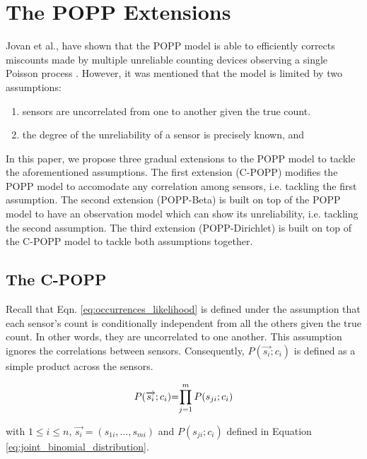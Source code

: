 \section{The POPP Extensions}
\label{sec:popp_extensions}

Jovan et al., have shown that the POPP model is able to efficiently corrects miscounts made by multiple unreliable counting devices observing a single Poisson process \cite{jovan18a} . However, it was mentioned that the model is limited by two assumptions:
\begin{enumerate}
    \item sensors are uncorrelated from one to another given the true count. 
    \item the degree of the unreliability of a sensor is precisely known, and
\end{enumerate}
In this paper, we propose three gradual extensions to the POPP model to tackle the aforementioned assumptions. The first extension (C-POPP) modifies the POPP model to accomodate any correlation among sensors, i.e. tackling the first assumption. The second extension (POPP-Beta) is built on top of the POPP model to have an observation model which can show its unreliability, i.e. tackling the second assumption. The third extension (POPP-Dirichlet) is built on top of the C-POPP model to tackle both assumptions together. 

\subsection{The C-POPP}
\label{subsec:cpop}

Recall that Eqn. \ref{eq:occurrences_likelihood} is defined under the assumption that each sensor's count is conditionally independent from all the others given the true count. In other words, they are uncorrelated to one another. This assumption ignores the correlations between sensors. Consequently, $P(\overrightarrow{s_i} ; c_i)$ is defined as a simple product across the sensors. 

\begin{equation}
	\label{eq:independent_sensor_likelihood}
	\begin{tabular}{r@{=}l}
	$P(\overrightarrow{s_i} ; c_i)$ & $\displaystyle\prod_{j=1}^{m} P(s_{ji} ; c_i)$ \\ 
	\end{tabular}
\end{equation}

\noindent with $1 \leq i \leq n$, $\overrightarrow{s_i} = (s_{1i}, \ldots, s_{mi})$ and $P(s_{ji} ; c_i)$ defined in Equation \ref{eq:joint_binomial_distribution}.

